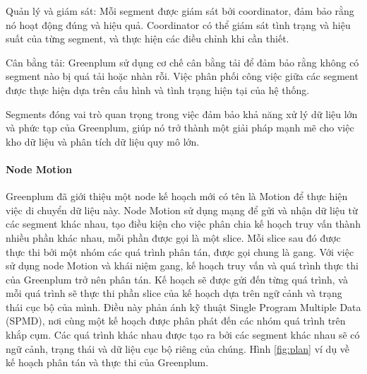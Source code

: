 \documentclass{article}[14pt]
\begin{document}
Quản lý và giám sát:
Mỗi segment được giám sát bởi coordinator, đảm bảo rằng nó hoạt động đúng
và hiệu quả. Coordinator có thể giám sát tình trạng và hiệu suất của từng segment, và thực hiện các điều chỉnh khi cần thiết.

Cân bằng tải: Greenplum sử dụng cơ chế cân bằng tải để đảm bảo rằng không có segment nào bị quá tải hoặc nhàn rỗi.
Việc phân phối công việc giữa các segment được thực hiện dựa trên cấu hình và tình trạng hiện tại của hệ thống.

Segments đóng vai trò quan trọng trong việc đảm bảo khả năng xử lý dữ liệu lớn và phức tạp của Greenplum, giúp nó trở thành một giải pháp mạnh mẽ cho việc kho dữ liệu và phân tích dữ liệu quy mô lớn.

\paragraph{Node Motion}

Greenplum đã giới thiệu một node kế hoạch mới có tên là Motion để thực hiện việc di chuyển dữ liệu này. Node Motion sử dụng mạng để gửi và nhận dữ liệu từ các segment khác nhau, tạo điều kiện cho việc phân chia kế hoạch truy vấn thành nhiều phần khác nhau, mỗi phần được gọi là một slice. Mỗi slice sau đó được thực thi bởi một nhóm các quá trình phân tán, được gọi chung là gang. Với việc sử dụng node Motion và khái niệm gang, kế hoạch truy vấn và quá trình thực thi của Greenplum trở nên phân tán. Kế hoạch sẽ được gửi đến từng quá trình, và mỗi quá trình sẽ thực thi phần slice của kế hoạch dựa trên ngữ cảnh và trạng thái cục bộ của mình. Điều này phản ánh kỹ thuật Single Program Multiple Data (SPMD), nơi cùng một kế hoạch được phân phát đến các nhóm quá trình trên khắp cụm. Các quá trình khác nhau được tạo ra bởi các segment khác nhau sẽ có ngữ cảnh, trạng thái và dữ liệu cục bộ riêng của chúng. Hình \ref{fig:plan} ví dụ về kế hoạch phân tán và thực thi của Greenplum.
\end{document}
